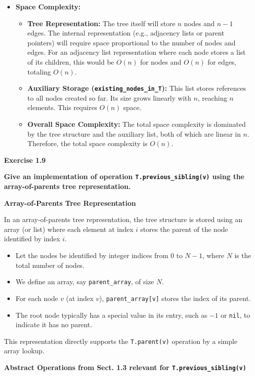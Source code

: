 \documentclass{article}
\begin{document}
\begin{itemize}
    \item \textbf{Space Complexity:}
    \begin{itemize}
        \item \textbf{Tree Representation:} The tree itself will store $n$ nodes and $n-1$ edges. The internal representation (e.g., adjacency lists or parent pointers) will require space proportional to the number of nodes and edges. For an adjacency list representation where each node stores a list of its children, this would be $O(n)$ for nodes and $O(n)$ for edges, totaling $O(n)$.
        \item \textbf{Auxiliary Storage (\texttt{existing\_nodes\_in\_T}):} This list stores references to all nodes created so far. Its size grows linearly with $n$, reaching $n$ elements. This requires $O(n)$ space.
        \item \textbf{Overall Space Complexity:} The total space complexity is dominated by the tree structure and the auxiliary list, both of which are linear in $n$. Therefore, the total space complexity is $O(n)$.
    \end{itemize}
\end{itemize}

\textbf{Exercise 1.9}

\textbf{Give an implementation of operation \texttt{T.previous\_sibling(v)} using the array-of-parents tree representation.}

\textbf{Array-of-Parents Tree Representation}

In an array-of-parents tree representation, the tree structure is stored using an array (or list) where each element at index $i$ stores the parent of the node identified by index $i$.
\begin{itemize}
    \item Let the nodes be identified by integer indices from $0$ to $N-1$, where $N$ is the total number of nodes.
    \item We define an array, say \texttt{parent\_array}, of size $N$.
    \item For each node $v$ (at index $v$), \texttt{parent\_array[v]} stores the index of its parent.
    \item The root node typically has a special value in its entry, such as $-1$ or \texttt{nil}, to indicate it has no parent.
\end{itemize}
This representation directly supports the \texttt{T.parent(v)} operation by a simple array lookup.

\textbf{Abstract Operations from Sect. 1.3 relevant for \texttt{T.previous\_sibling(v)}}
\end{document}
